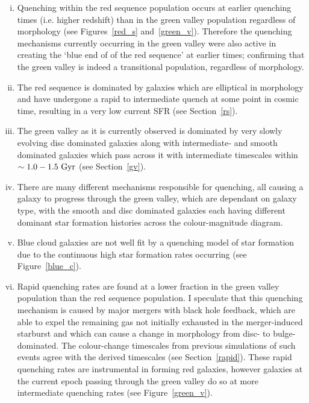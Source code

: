 \begin{enumerate}[(i)]
\item Quenching within the red sequence population occurs at earlier quenching times (i.e. higher redshift) than in the green valley population regardless of morphology (see Figures~\ref{red_s} and~\ref{green_v}). Therefore the quenching mechanisms currently occurring in the green valley were also active in creating the `blue end of of the red sequence' at earlier times; confirming that the green valley is indeed a transitional population, regardless of morphology.

\item The red sequence is dominated by galaxies which are elliptical in morphology and have undergone a rapid to intermediate quench at some point in cosmic time, resulting in a very low current SFR (see Section~\ref{rs}).

\item The green valley as it is currently observed is dominated by very slowly evolving disc dominated galaxies along with intermediate- and smooth dominated galaxies which pass across it with intermediate timescales within $\sim 1.0-1.5~\rm{Gyr}$ (see Section~\ref{gv}).

\item There are many different mechanisms responsible for quenching, all causing a galaxy to progress through the green valley, which are dependant on galaxy type, with the smooth and disc dominated galaxies each having different dominant star formation histories across the colour-magnitude diagram. 

\item Blue cloud galaxies are not well fit by a quenching model of star formation due to the continuous high star formation rates occurring (see Figure~\ref{blue_c}).

\item Rapid quenching rates are found at a lower fraction in the green valley population than the red sequence population. I speculate that this quenching mechanism is caused by major mergers with black hole feedback, which are able to expel the remaining gas not initially exhausted in the merger-induced starburst and which can cause a change in morphology from disc- to bulge-dominated. The colour-change timescales from previous simulations of such events agree with the derived timescales (see Section~\ref{rapid}). These rapid quenching rates are instrumental in forming red galaxies, however galaxies at the current epoch passing through the green valley do so at more intermediate quenching rates (see Figure~\ref{green_v}).


\end{enumerate}
